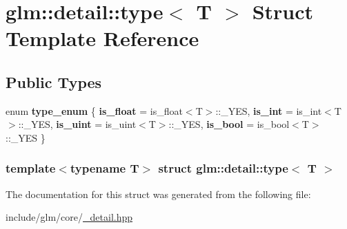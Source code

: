 \hypertarget{structglm_1_1detail_1_1type}{\section{glm\-:\-:detail\-:\-:type$<$ \-T $>$ \-Struct \-Template \-Reference}
\label{structglm_1_1detail_1_1type}
}
\subsection*{\-Public \-Types}
\begin{DoxyCompactItemize}
\item 
enum {\bfseries type\-\_\-enum} \{ {\bfseries is\-\_\-float} =  is\-\_\-float$<$\-T$>$\-:\-:\-\_\-\-Y\-E\-S, 
{\bfseries is\-\_\-int} =  is\-\_\-int$<$\-T$>$\-:\-:\-\_\-\-Y\-E\-S, 
{\bfseries is\-\_\-uint} =  is\-\_\-uint$<$\-T$>$\-:\-:\-\_\-\-Y\-E\-S, 
{\bfseries is\-\_\-bool} =  is\-\_\-bool$<$\-T$>$\-:\-:\-\_\-\-Y\-E\-S
 \}
\end{DoxyCompactItemize}
\subsubsection*{template$<$typename T$>$ struct glm\-::detail\-::type$<$ T $>$}



\-The documentation for this struct was generated from the following file\-:\begin{DoxyCompactItemize}
\item 
include/glm/core/\hyperlink{__detail_8hpp}{\-\_\-detail.\-hpp}\end{DoxyCompactItemize}
